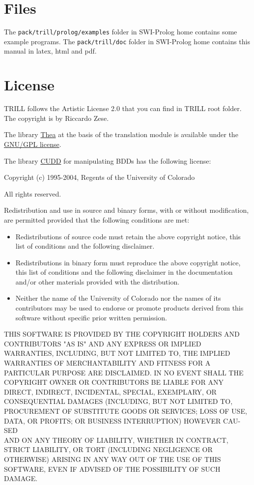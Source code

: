 \documentclass[a4paper,10pt]{scrartcl}
\begin{document}
\section{Files}
The \texttt{pack/trill/prolog/examples} folder in SWI-Prolog home contains some example programs.
The \texttt{pack/trill/doc} folder in SWI-Prolog home contains this manual in latex, html and pdf.


\section{License}
\label{license}



TRILL follows the Artistic License 2.0 that you can find in TRILL root folder. The copyright is by Riccardo Zese.
\vspace{3mm}

The library \href{http://vangelisv.github.io/thea/}{Thea} at the basis of the translation module is available under the \href{http://www.gnu.org/copyleft/gpl.html}{GNU/GPL license}.

The library \href{http://vlsi.colorado.edu/\string ~fabio/}{CUDD} for manipulating BDDs has the following license:

\vspace{3mm}

Copyright (c) 1995-2004, Regents of the University of Colorado

All rights reserved.

Redistribution and use in source and binary forms, with or without
modification, are permitted provided that the following conditions
are met:

\begin{itemize}
\item
Redistributions of source code must retain the above copyright
notice, this list of conditions and the following disclaimer.
\item
Redistributions in binary form must reproduce the above copyright
notice, this list of conditions and the following disclaimer in the
documentation and/or other materials provided with the distribution.
\item
Neither the name of the University of Colorado nor the names of its
contributors may be used to endorse or promote products derived from
this software without specific prior written permission.
\end{itemize}
THIS SOFTWARE IS PROVIDED BY THE COPYRIGHT HOLDERS AND CONTRIBUTORS
"AS IS" AND ANY EXPRESS OR IMPLIED WARRAN\-TIES, INCLUDING, BUT NOT
LIMITED TO, THE IMPLIED WARRANTIES OF MERCHANTABILITY AND FITNESS
FOR A PARTICULAR PURPOSE ARE DISCLAIMED. IN NO EVENT SHALL THE
COPYRIGHT OWNER OR CONTRIBUTORS BE LIABLE FOR ANY DIRECT, INDIRECT,
INCIDENTAL, SPECIAL, EXEMPLARY, OR CONSEQUENTIAL DAMAGES (INCLUDING,
BUT NOT LIMITED TO, PROCUREMENT OF SUBSTITUTE GOODS OR SERVICES;
LOSS OF USE, DATA, OR PROFITS; OR BUSINESS INTERRUPTION) HOWEVER
CAU-SED
\\ AND ON ANY THEORY OF LIABILITY, WHETHER IN CONTRACT, STRICT
LIABILITY, OR TORT (INCLUDING NEGLIGENCE OR OTHERWISE) ARISING IN
ANY WAY OUT OF THE USE OF THIS SOFTWARE, EVEN IF ADVISED OF THE
POSSIBILITY OF SUCH DAMAGE.





\appendix

\end{document}
